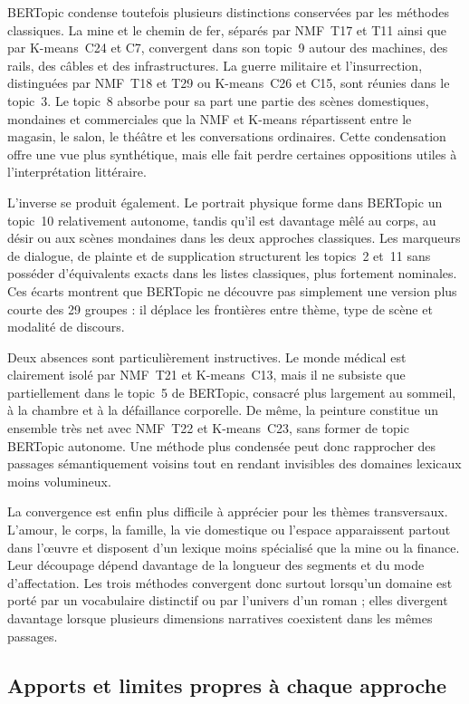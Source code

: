 BERTopic condense toutefois plusieurs distinctions conservées par les méthodes classiques. La mine et le chemin de fer, séparés par NMF~T17 et T11 ainsi que par K-means~C24 et C7, convergent dans son topic~9 autour des machines, des rails, des câbles et des infrastructures. La guerre militaire et l'insurrection, distinguées par NMF~T18 et T29 ou K-means~C26 et C15, sont réunies dans le topic~3. Le topic~8 absorbe pour sa part une partie des scènes domestiques, mondaines et commerciales que la NMF et K-means répartissent entre le magasin, le salon, le théâtre et les conversations ordinaires. Cette condensation offre une vue plus synthétique, mais elle fait perdre certaines oppositions utiles à l'interprétation littéraire.

L'inverse se produit également. Le portrait physique forme dans BERTopic un topic~10 relativement autonome, tandis qu'il est davantage mêlé au corps, au désir ou aux scènes mondaines dans les deux approches classiques. Les marqueurs de dialogue, de plainte et de supplication structurent les topics~2 et~11 sans posséder d'équivalents exacts dans les listes classiques, plus fortement nominales. Ces écarts montrent que BERTopic ne découvre pas simplement une version plus courte des 29 groupes : il déplace les frontières entre thème, type de scène et modalité de discours.

Deux absences sont particulièrement instructives. Le monde médical est clairement isolé par NMF~T21 et K-means~C13, mais il ne subsiste que partiellement dans le topic~5 de BERTopic, consacré plus largement au sommeil, à la chambre et à la défaillance corporelle. De même, la peinture constitue un ensemble très net avec NMF~T22 et K-means~C23, sans former de topic BERTopic autonome. Une méthode plus condensée peut donc rapprocher des passages sémantiquement voisins tout en rendant invisibles des domaines lexicaux moins volumineux.

La convergence est enfin plus difficile à apprécier pour les thèmes transversaux. L'amour, le corps, la famille, la vie domestique ou l'espace apparaissent partout dans l'œuvre et disposent d'un lexique moins spécialisé que la mine ou la finance. Leur découpage dépend davantage de la longueur des segments et du mode d'affectation. Les trois méthodes convergent donc surtout lorsqu'un domaine est porté par un vocabulaire distinctif ou par l'univers d'un roman ; elles divergent davantage lorsque plusieurs dimensions narratives coexistent dans les mêmes passages.

\subsection{Apports et limites propres à chaque approche}

